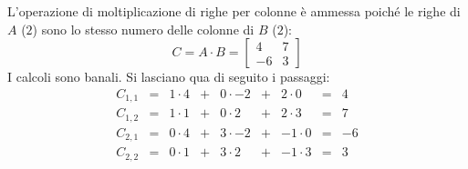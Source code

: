 \documentclass[a4paper]{article}
\begin{document}
	L'operazione di moltiplicazione di righe per colonne è ammessa poiché le righe di $A$ ($2$) sono lo stesso numero delle colonne di $B$ ($2$):
	\begin{equation*}
		C = A \cdot B = \begin{bmatrix}
			4  & 7 \\
			-6 & 3
		\end{bmatrix}
	\end{equation*}
	I calcoli sono banali. Si lasciano qua di seguito i passaggi:
	\begin{equation*}
		\begin{array}{lllllllll}
			C_{1,1} & = & 1 \cdot 4 & + & 0 \cdot -2 & + & 2 \cdot 0 & = & 4	\\
			C_{1,2} & = & 1 \cdot 1 & + & 0 \cdot 2 & + & 2 \cdot 3 & = & 7		\\
			C_{2,1} & = & 0 \cdot 4 & + & 3 \cdot -2 & + & -1 \cdot 0 & = & -6	\\
			C_{2,2} & = & 0 \cdot 1 & + & 3 \cdot 2 & + & -1 \cdot 3 & = & 3
		\end{array}
	\end{equation*}\newpage
\end{document}
